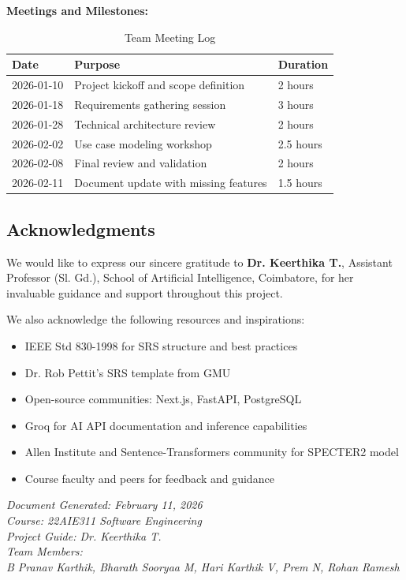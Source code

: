 \documentclass[11pt,a4paper]{article}
\begin{document}
\textbf{Meetings and Milestones:}
\begin{table}[H]
\centering
\begin{tabular}{p{3cm}p{5cm}p{5cm}}
\toprule
\textbf{Date} & \textbf{Purpose} & \textbf{Duration} \\
\midrule
2026-01-10 & Project kickoff and scope definition & 2 hours \\
2026-01-18 & Requirements gathering session & 3 hours \\
2026-01-28 & Technical architecture review & 2 hours \\
2026-02-02 & Use case modeling workshop & 2.5 hours \\
2026-02-08 & Final review and validation & 2 hours \\
2026-02-11 & Document update with missing features & 1.5 hours \\
\bottomrule
\end{tabular}
\caption{Team Meeting Log}
\end{table}

\subsection{Acknowledgments}

We would like to express our sincere gratitude to \textbf{Dr. Keerthika T.}, Assistant Professor (Sl. Gd.), School of Artificial Intelligence, Coimbatore, for her invaluable guidance and support throughout this project.

We also acknowledge the following resources and inspirations:
\begin{itemize}
    \item IEEE Std 830-1998 for SRS structure and best practices
    \item Dr. Rob Pettit's SRS template from GMU
    \item Open-source communities: Next.js, FastAPI, PostgreSQL
    \item Groq for AI API documentation and inference capabilities
    \item Allen Institute and Sentence-Transformers community for SPECTER2 model
    \item Course faculty and peers for feedback and guidance
\end{itemize}

\vspace{1cm}
\noindent\textit{Document Generated: February 11, 2026} \\
\noindent\textit{Course: 22AIE311 Software Engineering} \\
\noindent\textit{Project Guide: Dr. Keerthika T.} \\
\vspace{0.3cm}
\noindent\textit{Team Members:} \\
\noindent\textit{B Pranav Karthik, Bharath Sooryaa M, Hari Karthik V, Prem N, Rohan Ramesh}
\end{document}

